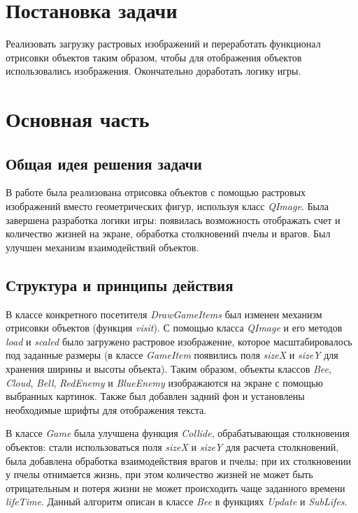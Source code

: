 \documentclass[a4paper,14pt]{article}
\begin{document}

\setcounter{page}{2} %

\renewcommand\contentsname{\centering {\normalsize Содержание}}
\tableofcontents
\newpage

\section*{Постановка задачи}

Реализовать загрузку растровых изображений и переработать функционал отрисовки объектов таким образом, чтобы для отображения объектов использовались изображения. Окончательно доработать логику игры.


\newpage

\section{Основная часть}
\subsection{Общая идея решения задачи}
В работе была реализована отрисовка объектов с помощью растровых изображений вместо геометрических фигур, используя класс \textit{QImage}. Была завершена разработка логики игры: появилась возможность отображать счет и количество жизней на экране, обработка столкновений пчелы и врагов. Был улучшен механизм взаимодействий объектов.

\subsection{Структура и принципы действия}
В классе конкретного посетителя \textit{DrawGameItems} был изменен механизм отрисовки объектов (функция \textit{visit}). С помощью класса \textit{QImage} и его методов \textit{load} и \textit{scaled} было загружено растровое изображение, которое масштабировалось под заданные размеры (в классе \textit{GameItem} появились поля \textit{sizeX} и \textit{sizeY} для хранения ширины и высоты объекта). Таким образом, объекты классов \textit{Bee}, \textit{Cloud}, \textit{Bell}, \textit{RedEnemy} и \textit{BlueEnemy} изображаются на экране с помощью выбранных картинок. Также был добавлен задний фон и установлены необходимые шрифты для отображения текста.

В классе \textit{Game} была улучшена функция \textit{Collide}, обрабатывающая столкновения объектов: стали использоваться поля \textit{sizeX} и \textit{sizeY} для расчета столкновений, была добавлена обработка взаимодействия врагов и пчелы; при их столкновении у пчелы отнимается жизнь, при этом количество жизней не может быть отрицательным и потеря жизни не может происходить чаще заданного времени \textit{lifeTime}. Данный алгоритм описан в классе \textit{Bee} в функциях \textit{Update} и \textit{SubLifes}.
\end{document}
